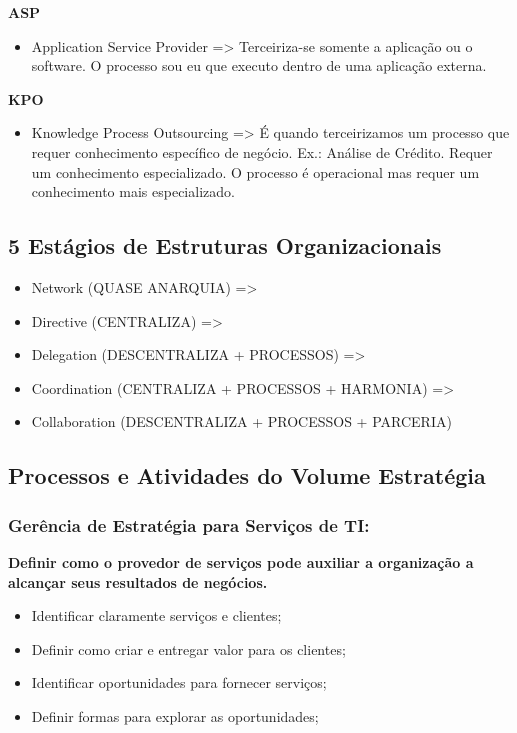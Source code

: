 \textbf{ASP}
\begin{itemize}
	\item Application Service Provider => Terceiriza-se somente a aplicação ou o software. O processo sou eu que executo dentro de uma aplicação externa.
\end{itemize}

\textbf{KPO}
\begin{itemize}
	\item Knowledge Process Outsourcing => É quando terceirizamos um processo que requer conhecimento específico de negócio. Ex.: Análise de Crédito. Requer um conhecimento especializado. O processo é operacional mas requer um conhecimento mais especializado.
\end{itemize}

\subsection{5 Estágios de Estruturas Organizacionais}
\begin{itemize}
	\item Network (QUASE ANARQUIA) =>
	\item Directive (CENTRALIZA) =>
	\item Delegation (DESCENTRALIZA + PROCESSOS) =>
	\item Coordination (CENTRALIZA + PROCESSOS + HARMONIA) =>
	\item Collaboration (DESCENTRALIZA + PROCESSOS + PARCERIA)
\end{itemize}

\subsection{Processos e Atividades do Volume Estratégia}

\subsubsection{Gerência de Estratégia para Serviços de TI:}

\textbf{Definir como o provedor de serviços pode auxiliar a organização a alcançar seus resultados de negócios.}
\begin{itemize}
	\item Identificar claramente serviços e clientes;
	\item Definir como criar e entregar valor para os clientes;
	\item Identificar oportunidades para fornecer serviços;
	\item Definir formas para explorar as oportunidades;
\end{itemize}

